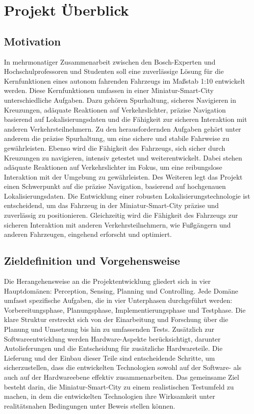 \chapter{Projekt Überblick}

\section{Motivation}
In mehrmonatiger Zusammenarbeit zwischen den Bosch-Experten und Hochschulprofessoren und Studenten soll eine zuverlässige Lösung für die Kernfunktionen eines autonom fahrenden Fahrzeugs im Maßstab 1:10 entwickelt werden. Diese Kernfunktionen umfassen in einer Miniatur-Smart-City unterschiedliche Aufgaben. Dazu gehören Spurhaltung, sicheres Navigieren in Kreuzungen, adäquate Reaktionen auf Verkehrslichter, präzise Navigation basierend auf Lokalisierungsdaten und die Fähigkeit zur sicheren Interaktion mit anderen Verkehrsteilnehmern.\cite{boschfumobility}
Zu den herausfordernden Aufgaben gehört unter anderem die präzise Spurhaltung, um eine sichere und stabile Fahrweise zu gewährleisten. Ebenso wird die Fähigkeit des Fahrzeugs, sich sicher durch Kreuzungen zu navigieren, intensiv getestet und weiterentwickelt. Dabei stehen adäquate Reaktionen auf Verkehrslichter im Fokus, um eine reibungslose Interaktion mit der Umgebung zu gewährleisten. 
Des Weiteren legt das Projekt einen Schwerpunkt auf die präzise Navigation, basierend auf hochgenauen Lokalisierungsdaten. Die Entwicklung einer robusten Lokalisierungstechnologie ist entscheidend, um das Fahrzeug in der Miniatur-Smart-City präzise und zuverlässig zu positionieren. Gleichzeitig wird die Fähigkeit des Fahrzeugs zur sicheren Interaktion mit anderen Verkehrsteilnehmern, wie Fußgängern und anderen Fahrzeugen, eingehend erforscht und optimiert.

\newpage

 
\section{Zieldefinition und Vorgehensweise}
Die Herangehensweise an die Projektentwicklung gliedert sich in vier Hauptdomänen: Perception, Sensing, Planning und Controlling. Jede Domäne umfasst spezifische Aufgaben, die in vier Unterphasen durchgeführt werden: Vorbereitungsphase, Planungsphase, Implementierungsphase und Testphase. Die klare Struktur erstreckt sich von der Einarbeitung und Forschung über die Planung und Umsetzung bis hin zu umfassenden Tests. Zusätzlich zur Softwareentwicklung werden Hardware-Aspekte berücksichtigt, darunter Autolieferungen und die Entscheidung für zusätzliche Hardwareteile. Die Lieferung und der Einbau dieser Teile sind entscheidende Schritte, um sicherzustellen, dass die entwickelten Technologien sowohl auf der Software- als auch auf der Hardwareebene effektiv zusammenarbeiten. Das gemeinsame Ziel besteht darin, die Miniatur-Smart-City zu einem realistischen Testumfeld zu machen, in dem die entwickelten Technologien ihre Wirksamkeit unter realitätsnahen Bedingungen unter Beweis stellen können.



